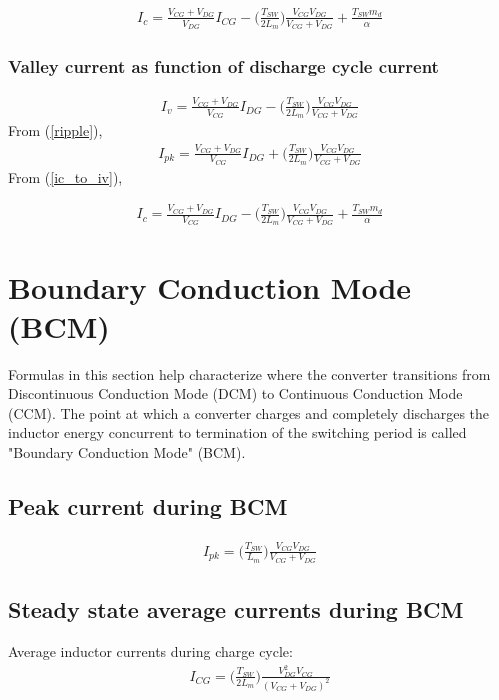 \documentclass{scrartcl}
\begin{document}
			\begin{align}
			I_{c} = \frac{V_{CG} + V_{DG}}{V_{DG}} I_{CG} - \bigg(\frac{T_{SW}}{2L_m}\bigg)\frac{V_{CG}V_{DG}}{V_{CG} + V_{DG}} + \frac{T_{SW}m_d} {\alpha}
			\end{align}				
				
			\subsubsection{Valley current as function of discharge cycle current}
			\begin{align}
			I_{v} = \frac{V_{CG} + V_{DG}}{V_{CG}} I_{DG} - \bigg(\frac{T_{SW}}{2L_m}\bigg)\frac{V_{CG}V_{DG}}{V_{CG} + V_{DG}} 
			\end{align}				
			From (\ref{ripple}),
			\begin{align}
			I_{pk} = \frac{V_{CG} + V_{DG}}{V_{CG}} I_{DG} + \bigg(\frac{T_{SW}}{2L_m}\bigg)\frac{V_{CG}V_{DG}}{V_{CG} + V_{DG}} 
			\end{align}	
			From (\ref{ic_to_iv}),
			
			\begin{align}
			I_{c} = \frac{V_{CG} + V_{DG}}{V_{CG}} I_{DG} - \bigg(\frac{T_{SW}}{2L_m}\bigg)\frac{V_{CG}V_{DG}}{V_{CG} + V_{DG}} + \frac{T_{SW}m_d} {\alpha}
			\end{align}	

	\section{Boundary Conduction Mode (BCM)}
	Formulas in this section help characterize where the converter transitions from Discontinuous Conduction Mode (DCM) to Continuous Conduction Mode (CCM). The point at which a converter charges and completely discharges the inductor energy concurrent to termination of the switching period is called "Boundary Conduction Mode" (BCM).
		\subsection{Peak current during BCM}
		
			\begin{align}
			I_{pk} = \bigg(\frac{T_{SW}}{L_m}\bigg)\frac{V_{CG}V_{DG}}{V_{CG} + V_{DG}} 
			\end{align}	
			
		\subsection{Steady state average currents during BCM}
			Average inductor currents during charge cycle:
			\begin{align}
			I_{CG} = \bigg(\frac{T_{SW}}{2L_m}\bigg)\frac{V_{DG}^2 V_{CG}}{(V_{CG} + V_{DG})^2} 
			\end{align}			
\end{document}
